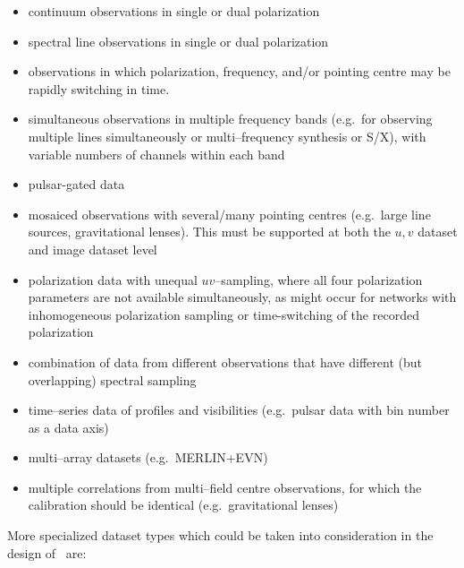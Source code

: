 \begin{itemize} 

\item continuum observations in single or dual polarization

\item spectral line observations in single or dual polarization
  
\item observations in which polarization, frequency, and\slash or pointing
  centre may be rapidly switching in time.
  
\item simultaneous observations in multiple frequency bands (e.g.\ for
  observing multiple lines simultaneously or multi--frequency
  synthesis or S/X), with variable numbers of channels within each band

\item pulsar-gated data
  
\item mosaiced observations with several\slash many pointing centres
  (e.g.\ large line sources, gravitational lenses).  This must be
  supported at both the $u,\! v$ dataset and image dataset level
  
\item polarization data with unequal $uv$--sampling, where all four
  polarization parameters are not available simultaneously, as might
  occur for networks with inhomogeneous polarization sampling or
  time-switching of the recorded polarization
  
\item combination of data from different observations that have
  different (but overlapping) spectral sampling
  
\item time--series data of profiles and visibilities (e.g.\ pulsar
  data with bin number as a data axis)
  
\item multi--array datasets (e.g.\ MERLIN+EVN)
  
\item multiple correlations from multi--field centre observations,
  for which the calibration should be identical (e.g.\  gravitational
  lenses)

\end{itemize}

\noindent
More specialized dataset types which could be taken into
consideration in the design of \aipspp\ are:


